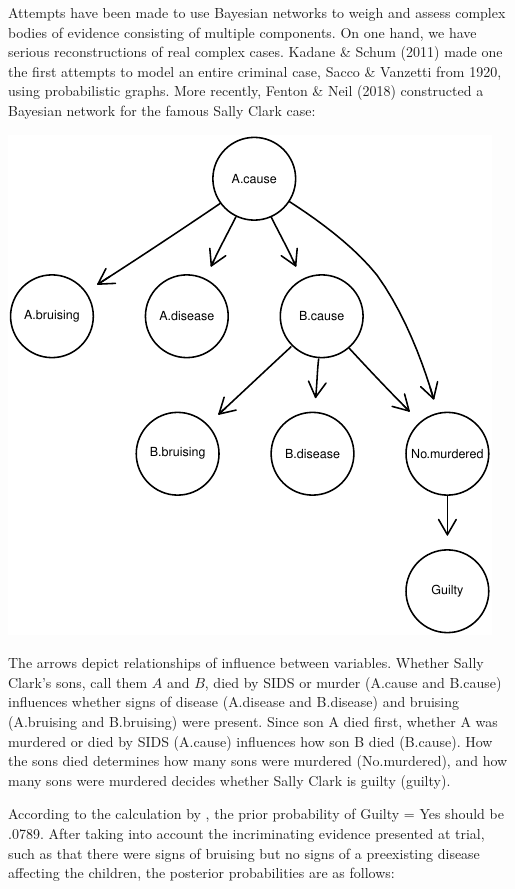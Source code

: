\documentclass[11pt,dvipsnames,enabledeprecatedfontcommands]{scrartcl}
\begin{document}
Attempts have been made to use Bayesian networks to weigh and assess
complex bodies of evidence consisting of multiple components. On one
hand, we have serious reconstructions of real complex cases. Kadane \&
Schum (2011) made one the first attempts to model an entire criminal
case, Sacco \& Vanzetti from 1920, using probabilistic graphs. More
recently, Fenton \& Neil (2018) constructed a Bayesian network for the
famous Sally Clark case:

\begin{center}\includegraphics{BNfiles/unnamed-chunk-11-1} \end{center}

\noindent
The arrows depict relationships of influence between variables. Whether
Sally Clark's sons, call them \(A\) and \(B\), died by SIDS or murder
(\textsf{A.cause} and \textsf{B.cause}) influences whether signs of
disease (\textsf{A.disease} and \textsf{B.disease}) and bruising
(\textsf{A.bruising} and \textsf{B.bruising}) were present. Since son A
died first, whether A was murdered or died by SIDS (\textsf{A.cause})
influences how son B died (\textsf{B.cause}). How the sons died
determines how many sons were murdered (\textsf{No.murdered}), and how
many sons were murdered decides whether Sally Clark is guilty
(\textsf{guilty}).

According to the calculation by \cite{Fenton2018Risk}, the prior
probability of \textrm{Guilty = Yes} should be .0789. After taking into
account the incriminating evidence presented at trial, such as that
there were signs of bruising but no signs of a preexisting disease
affecting the children, the posterior probabilities are as follows:
\end{document}
